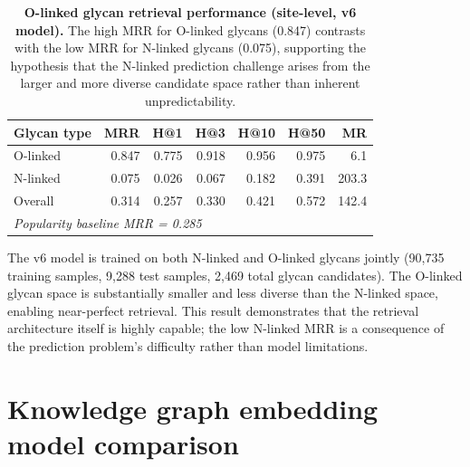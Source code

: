 \documentclass[11pt,a4paper]{article}
\begin{document}
\begin{table}[H]
\centering
\caption{\textbf{O-linked glycan retrieval performance (site-level, v6 model).}
The high MRR for O-linked glycans (0.847) contrasts with the low MRR for
N-linked glycans (0.075), supporting the hypothesis that the N-linked
prediction challenge arises from the larger and more diverse candidate space
rather than inherent unpredictability.}
\label{tab:olinked}
\small
\begin{tabular}{lrrrrrr}
\toprule
\textbf{Glycan type} & \textbf{MRR} & \textbf{H@1} & \textbf{H@3} & \textbf{H@10} & \textbf{H@50} & \textbf{MR} \\
\midrule
O-linked   & 0.847 & 0.775 & 0.918 & 0.956 & 0.975 & 6.1 \\
N-linked   & 0.075 & 0.026 & 0.067 & 0.182 & 0.391 & 203.3 \\
Overall    & 0.314 & 0.257 & 0.330 & 0.421 & 0.572 & 142.4 \\
\midrule
\multicolumn{7}{l}{\textit{Popularity baseline MRR = 0.285}} \\
\bottomrule
\end{tabular}
\end{table}

The v6 model is trained on both N-linked and O-linked glycans jointly (90,735
training samples, 9,288 test samples, 2,469 total glycan candidates). The
O-linked glycan space is substantially smaller and less diverse than the
N-linked space, enabling near-perfect retrieval. This result demonstrates that
the retrieval architecture itself is highly capable; the low N-linked MRR is a
consequence of the prediction problem's difficulty rather than model
limitations.

\section{Knowledge graph embedding model comparison}
\label{sec:kg_embedding}
\end{document}
